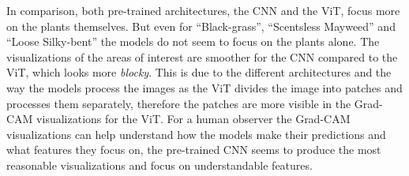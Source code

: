 In comparison, both pre-trained architectures, the CNN and the ViT, focus more on the plants themselves. But even for ``Black-grass'', ``Scentsless Mayweed'' and ``Loose Silky-bent'' the models do not seem to focus on the plants alone. The visualizations of the areas of interest are smoother for the CNN compared to the ViT, which looks more \textit{blocky}. This is due to the different architectures and the way the models process the images as the ViT divides the image into patches and processes them separately, therefore the patches are more visible in the Grad-CAM visualizations for the ViT. For a human observer the Grad-CAM visualizations can help understand how the models make their predictions and what features they focus on, the pre-trained CNN seems to produce the most reasonable visualizations and focus on understandable features.